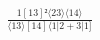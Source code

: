 \documentclass[varwidth, border=5pt]{standalone}
\begin{document}
\begin{my}
$\begin{gathered}
\scriptscriptstyle\frac{1[13]²⟨23⟩⟨14⟩}{⟨13⟩[14]⟨1|2+3|1]}
\end{gathered}$
\end{my}
\end{document}
